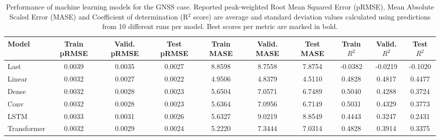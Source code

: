 \begin{table}
\caption{Performance of machine learning models for the GNSS case. Reported peak-weighted Root Mean Squared Error (pRMSE), Mean Absolute Scaled Error (MASE) and Coefficient of determination (R$^2$ score) are average and standard deviation values calculated using predictions from 10 different runs per model. Best scores per metric are marked in bold.}
\label{tab:ml_perf_gnss}
\begin{tabular}{lccccccccc}
\toprule
Model & Train pRMSE & Valid. pRMSE & Test pRMSE & Train MASE & Valid. MASE & Test MASE & Train $R^2$ & Valid. $R^2$ & Test $R^2$ \\
\midrule
Last & 0.0039 & 0.0035 & 0.0027 & 8.8598 & 8.7558 & 7.8754 & -0.0382 & -0.0219 & -0.1020 \\
Linear & 0.0032 & 0.0027 & 0.0022 & 4.9506 & 4.8379 & 4.5110 & 0.4828 & 0.4817 & 0.4477 \\
Dense & 0.0032 & 0.0028 & 0.0023 & 5.6504 & 7.0571 & 6.7489 & 0.5040 & 0.4288 & 0.3724 \\
Conv & 0.0032 & 0.0028 & 0.0023 & 5.6364 & 7.0956 & 6.7149 & 0.5031 & 0.4329 & 0.3773 \\
LSTM & 0.0033 & 0.0031 & 0.0026 & 5.6327 & 9.0219 & 8.8549 & 0.4443 & 0.3247 & 0.2431 \\
Transformer & 0.0032 & 0.0029 & 0.0024 & 5.2220 & 7.3444 & 7.0314 & 0.4828 & 0.3914 & 0.3375 \\
\bottomrule
\end{tabular}
\end{table}
